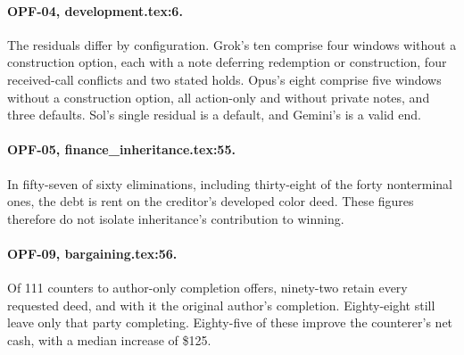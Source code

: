 \paragraph{OPF-04, development.tex:6.}
The residuals differ by configuration. Grok's ten comprise four windows without a construction option, each with a note deferring redemption or construction, four received-call conflicts and two stated holds. Opus's eight comprise five windows without a construction option, all action-only and without private notes, and three defaults. Sol's single residual is a default, and Gemini's is a valid end.

\paragraph{OPF-05, finance\_inheritance.tex:55.}
In fifty-seven of sixty eliminations, including thirty-eight of the forty nonterminal ones, the debt is rent on the creditor's developed color deed. These figures therefore do not isolate inheritance's contribution to winning.


\paragraph{OPF-09, bargaining.tex:56.}
Of 111 counters to author-only completion offers, ninety-two retain every requested deed, and with it the original author's completion. Eighty-eight still leave only that party completing. Eighty-five of these improve the counterer's net cash, with a median increase of \$125.

